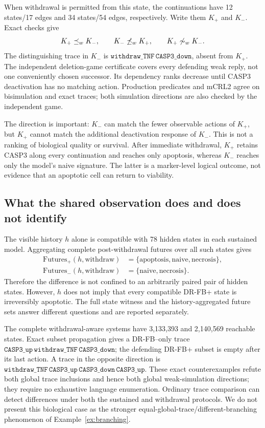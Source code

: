 \documentclass{ws-jbcb}
\numberwithin{equation}{section}
\newcommand{\weaksim}{\mathrel{\sim_{w}}}
\newcommand{\weakpre}{\mathrel{\preceq_{w}}}
\newcommand{\DRControlMinusStates}{2{,}140{,}569}
\newcommand{\DRControlPlusStates}{3{,}133{,}393}
\newcommand{\DRHistoryStates}{78}
\newcommand{\DRLocalMinusEdges}{54}
\newcommand{\DRLocalMinusStates}{34}
\newcommand{\DRLocalPlusEdges}{17}
\newcommand{\DRLocalPlusStates}{12}
\begin{document}
When withdrawal is permitted from this state, the continuations have
\DRLocalPlusStates{} states/\DRLocalPlusEdges{} edges and
\DRLocalMinusStates{} states/\DRLocalMinusEdges{} edges, respectively.
Write them $K_+$ and $K_-$. Exact checks give
\[
 K_+\weakpre K_-,\qquad K_-\not\weakpre K_+,\qquad
 K_+\not\weaksim K_-.
\]
The distinguishing trace in $K_-$ is
$\texttt{withdraw\_TNF}\,\texttt{CASP3\_down}$, absent from $K_+$.
The independent deletion-game certificate covers every defending weak reply,
not one conveniently chosen successor. Its dependency ranks decrease until
CASP3 deactivation has no matching action. Production predicates and mCRL2
agree on bisimulation and exact traces; both simulation directions are also
checked by the independent game.

The direction is important: $K_-$ can match the fewer observable actions of
$K_+$, but $K_+$ cannot match the additional deactivation response of $K_-$.
This is not a ranking of biological quality or survival. After immediate
withdrawal, $K_+$ retains CASP3 along every continuation and reaches only
apoptosis, whereas $K_-$ reaches only the model's naive signature. The latter
is a marker-level logical outcome, not evidence that an apoptotic cell can
return to viability.

\subsection{What the shared observation does and does not identify}

The visible history $h$ alone is compatible with \DRHistoryStates{} hidden
states in each sustained model. Aggregating complete post-withdrawal futures
over all such states gives
\[
\begin{split}
\mathrm{Futures}_+(h,\mathrm{withdraw})
 &=\{\mathrm{apoptosis},\mathrm{naive},\mathrm{necrosis}\},\\
\mathrm{Futures}_-(h,\mathrm{withdraw})
 &=\{\mathrm{naive},\mathrm{necrosis}\}.
\end{split}
\]
Therefore the difference is not confined to an arbitrarily paired pair of
hidden states. However, $h$ does not imply that every compatible DR-FB+ state
is irreversibly apoptotic. The full state witness and the history-aggregated
future sets answer different questions and are reported separately.

The complete withdrawal-aware systems have \DRControlPlusStates{} and
\DRControlMinusStates{} reachable states. Exact subset propagation gives a
DR-FB--only trace
$\texttt{CASP3\_up}\,\texttt{withdraw\_TNF}\,\texttt{CASP3\_down}$;
the defending DR-FB+ subset is empty after its last action. A trace in the
opposite direction is
$\texttt{withdraw\_TNF}\,\texttt{CASP3\_up}\,\texttt{CASP3\_down}\,
\texttt{CASP3\_up}$.
These exact counterexamples refute both global trace inclusions and hence both
global weak-simulation directions; they require no exhaustive language
enumeration. Ordinary trace comparison can detect differences under both the
sustained and withdrawal protocols. We do not present this biological
case as the stronger equal-global-trace/different-branching phenomenon of
Example~\ref{ex:branching}.
\end{document}
